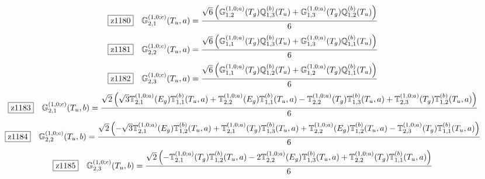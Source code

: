 \documentclass[fleqn,10pt,landscape]{jsarticle}
\begin{document}
\begin{dmath*}
\hspace*{3mm}\fbox{z1180}\quad \mathbb{G}_{2,1}^{(1,0;c)}(T_{u},a)=\frac{\sqrt{6} \left(\mathbb{G}_{1,2}^{(1,0;a)}(T_{g}) \mathbb{Q}_{1,3}^{(b)}(T_{u}) + \mathbb{G}_{1,3}^{(1,0;a)}(T_{g}) \mathbb{Q}_{1,2}^{(b)}(T_{u})\right)}{6}
\end{dmath*}
\begin{dmath*}
\hspace*{3mm}\fbox{z1181}\quad \mathbb{G}_{2,2}^{(1,0;c)}(T_{u},a)=\frac{\sqrt{6} \left(\mathbb{G}_{1,1}^{(1,0;a)}(T_{g}) \mathbb{Q}_{1,3}^{(b)}(T_{u}) + \mathbb{G}_{1,3}^{(1,0;a)}(T_{g}) \mathbb{Q}_{1,1}^{(b)}(T_{u})\right)}{6}
\end{dmath*}
\begin{dmath*}
\hspace*{3mm}\fbox{z1182}\quad \mathbb{G}_{2,3}^{(1,0;c)}(T_{u},a)=\frac{\sqrt{6} \left(\mathbb{G}_{1,1}^{(1,0;a)}(T_{g}) \mathbb{Q}_{1,2}^{(b)}(T_{u}) + \mathbb{G}_{1,2}^{(1,0;a)}(T_{g}) \mathbb{Q}_{1,1}^{(b)}(T_{u})\right)}{6}
\end{dmath*}
\begin{dmath*}
\hspace*{3mm}\fbox{z1183}\quad \mathbb{G}_{2,1}^{(1,0;c)}(T_{u},b)=\frac{\sqrt{2} \left(\sqrt{3} \mathbb{T}_{2,1}^{(1,0;a)}(E_{g}) \mathbb{T}_{1,1}^{(b)}(T_{u},a) + \mathbb{T}_{2,2}^{(1,0;a)}(E_{g}) \mathbb{T}_{1,1}^{(b)}(T_{u},a) - \mathbb{T}_{2,2}^{(1,0;a)}(T_{g}) \mathbb{T}_{1,3}^{(b)}(T_{u},a) + \mathbb{T}_{2,3}^{(1,0;a)}(T_{g}) \mathbb{T}_{1,2}^{(b)}(T_{u},a)\right)}{6}
\end{dmath*}
\begin{dmath*}
\hspace*{3mm}\fbox{z1184}\quad \mathbb{G}_{2,2}^{(1,0;c)}(T_{u},b)=\frac{\sqrt{2} \left(- \sqrt{3} \mathbb{T}_{2,1}^{(1,0;a)}(E_{g}) \mathbb{T}_{1,2}^{(b)}(T_{u},a) + \mathbb{T}_{2,1}^{(1,0;a)}(T_{g}) \mathbb{T}_{1,3}^{(b)}(T_{u},a) + \mathbb{T}_{2,2}^{(1,0;a)}(E_{g}) \mathbb{T}_{1,2}^{(b)}(T_{u},a) - \mathbb{T}_{2,3}^{(1,0;a)}(T_{g}) \mathbb{T}_{1,1}^{(b)}(T_{u},a)\right)}{6}
\end{dmath*}
\begin{dmath*}
\hspace*{3mm}\fbox{z1185}\quad \mathbb{G}_{2,3}^{(1,0;c)}(T_{u},b)=\frac{\sqrt{2} \left(- \mathbb{T}_{2,1}^{(1,0;a)}(T_{g}) \mathbb{T}_{1,2}^{(b)}(T_{u},a) - 2 \mathbb{T}_{2,2}^{(1,0;a)}(E_{g}) \mathbb{T}_{1,3}^{(b)}(T_{u},a) + \mathbb{T}_{2,2}^{(1,0;a)}(T_{g}) \mathbb{T}_{1,1}^{(b)}(T_{u},a)\right)}{6}
\end{dmath*}
\end{document}
